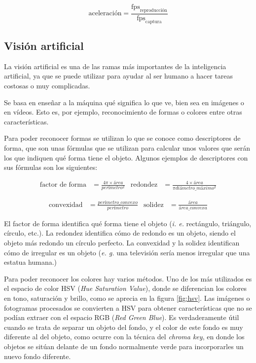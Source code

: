 \begin{equation}
	\text{aceleración} = \frac{\text{fps}_{\text{reproducción}}}{\text{fps}_{\text{captura}}}
\end{equation} 

\subsection{Visión artificial}
La visión artificial es una de las ramas más importantes de la inteligencia artificial, ya que se puede utilizar para ayudar al ser humano a hacer tareas costosas o muy complicadas.

Se basa en enseñar a la máquina qué significa lo que ve, bien sea en imágenes o en vídeos. Esto es, por ejemplo, reconocimiento de formas o colores entre otras características.

Para poder reconocer formas se utilizan lo que se conoce como descriptores de forma, que son unas fórmulas que se utilizan para calcular unos valores que serán los que indiquen qué forma tiene el objeto. Algunos ejemplos de descriptores con sus fórmulas son los siguientes:

\begin{align*}
	\text{factor de forma} &= \frac{4 \pi \times área}{perímetro^2} &
	\text{redondez} &= \frac{4 \times área}{\pi diámetro\_máximo^2}
\end{align*}

\begin{align}
	\text{convexidad} &= \frac{perímetro\_convexo}{perímetro} &
	\text{solidez} &= \frac{área}{área\_convexa}
\end{align}

El factor de forma identifica qué forma tiene el objeto (\textit{i. e.} rectángulo, triángulo, círculo, etc.). La redondez identifica cómo de redondo es un objeto, siendo el objeto más redondo un círculo perfecto. La convexidad y la solidez identifican cómo de irregular es un objeto (\textit{e. g.} una televisión sería menos irregular que una estatua humana.)

Para poder reconocer los colores hay varios métodos. Uno de los más utilizados es el espacio de color HSV (\textit{Hue Saturation Value}), donde se diferencian los colores en tono, saturación y brillo, como se aprecia en la figura \ref{fig:hsv}. Las imágenes o fotogramas procesados se convierten a HSV para obtener características que no se podían extraer con el espacio RGB (\textit{Red Green Blue}). Es verdaderamente útil cuando se trata de separar un objeto del fondo, y el color de este fondo es muy diferente al del objeto, como ocurre con la técnica del \textit{chroma key}, en donde los objetos se sitúan delante de un fondo normalmente verde para incorporarles un nuevo fondo diferente.

